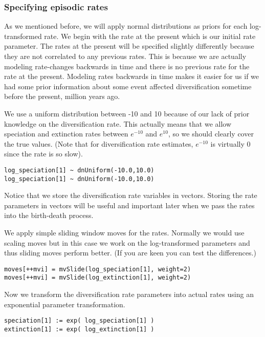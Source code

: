 \subsubsection{Specifying episodic rates}
As we mentioned before, we will apply normal distributions as priors for each log-transformed rate.
We begin with the rate at the present which is our initial rate parameter.
The rates at the present will be specified slightly differently because they are not correlated to any previous rates.
This is because we are actually modeling rate-changes backwards in time and there is no previous rate for the rate at the present.
Modeling rates backwards in time makes it easier for us if we had some prior information about some event affected diversification sometime before the present,  million years ago.

We use a uniform distribution between -10 and 10 because of our lack of prior knowledge on the diversification rate.
This actually means that we allow speciation and extinction rates between $e^{-10}$ and $e^10$, so we should clearly cover the true values.
(Note that for diversification rate estimates, $e^{-10}$ is virtually 0 since the rate is so slow).
{\tt \begin{snugshade*}
\begin{lstlisting}
log_speciation[1] ~ dnUniform(-10.0,10.0)
log_speciation[1] ~ dnUniform(-10.0,10.0)
\end{lstlisting}
\end{snugshade*}}
Notice that we store the diversification rate variables in vectors.
Storing the rate parameters in vectors will be useful and important later when we pass the rates into the birth-death process.

We apply simple sliding window moves for the rates.
Normally we would use scaling moves but in this case we work on the log-transformed parameters and thus sliding moves perform better.
(If you are keen you can test the differences.)
{\tt \begin{snugshade*}
\begin{lstlisting}
moves[++mvi] = mvSlide(log_speciation[1], weight=2)
moves[++mvi] = mvSlide(log_extinction[1], weight=2)
\end{lstlisting}
\end{snugshade*}}
Now we transform the diversification rate parameters into actual rates using an exponential parameter transformation.
{\tt \begin{snugshade*}
\begin{lstlisting}
speciation[1] := exp( log_speciation[1] )
extinction[1] := exp( log_extinction[1] )
\end{lstlisting}
\end{snugshade*}}

